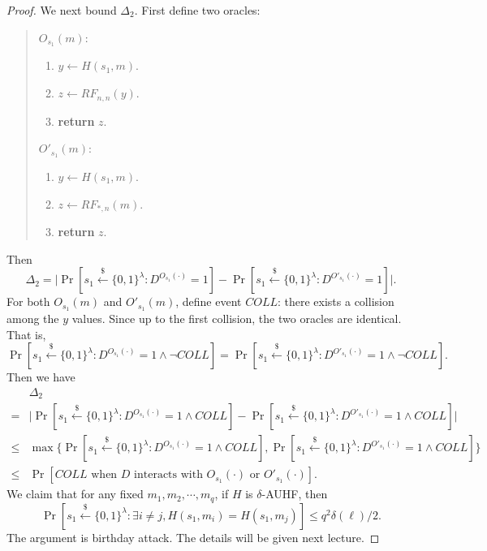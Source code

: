 \documentclass[12pt]{article}
\newcommand{\bits}{\{0,1\}}
\newcommand{\getsr}{\stackrel{\$}{\gets}}
\theoremstyle{definition}
\begin{document}
\begin{proof}
We next bound $\Delta_2$. First define two oracles:
\begin{quote}
\begin{minipage}{.3\textwidth}
$O_{s_1}(m)$:
\begin{enumerate}
\item $y \gets H(s_1, m)$.
\item $z \gets RF_{n,n}(y)$.
\item {\bf return} $z$.
\end{enumerate}
\end{minipage}
\begin{minipage}{.3\textwidth}
$O'_{s_1}(m)$:
\begin{enumerate}
\item $y \gets H(s_1, m)$.
\item $z \gets RF_{*,n}(m)$.
\item {\bf return} $z$.
\end{enumerate}
\end{minipage}
\end{quote}
Then 
$$\Delta_2 = \bigg| \Pr[s_1 \getsr \bits^\lambda : D^{O_{s_1}(\cdot)}=1] - \Pr[s_1 \getsr \bits^\lambda : D^{O'_{s_1}(\cdot)}=1] \bigg|.$$
For both $O_{s_1}(m)$ and $O'_{s_1}(m)$, define event $COLL$: there exists a collision among the $y$ values.
Since up to the first collision, the two oracles are identical. That is,
$$\Pr[s_1 \getsr \bits^\lambda : D^{O_{s_1}(\cdot)}=1 \wedge \neg COLL] = \Pr[s_1 \getsr \bits^\lambda : D^{O'_{s_1}(\cdot)}=1 \wedge \neg COLL].$$
Then we have 
$$\begin{aligned}
& \Delta_2 \\
 =& \bigg| \Pr[s_1 \getsr \bits^\lambda : D^{O_{s_1}(\cdot)}=1 \wedge COLL] - \Pr[s_1 \getsr \bits^\lambda : D^{O'_{s_1}(\cdot)}=1 \wedge COLL] \bigg| \\
\leq& \max\{\Pr[s_1 \getsr \bits^\lambda : D^{O_{s_1}(\cdot)}=1 \wedge COLL], \Pr[s_1 \getsr \bits^\lambda : D^{O'_{s_1}(\cdot)}=1 \wedge COLL]\} \\
\leq& \Pr[COLL \textrm{ when $D$ interacts with $O_{s_1}(\cdot)$ or $O'_{s_1}(\cdot)$}].
\end{aligned}$$
We claim that for any fixed $m_1,m_2,\cdots,m_q$, if $H$ is $\delta$-AUHF, then 
$$\Pr[s_1 \getsr \bits^\lambda : \exists i \not= j, H(s_1,m_i) = H(s_1,m_j)] \leq q^2\delta(\ell)/2.$$
The argument is birthday attack. 
The details will be given next lecture.
\end{proof}
\end{document}
